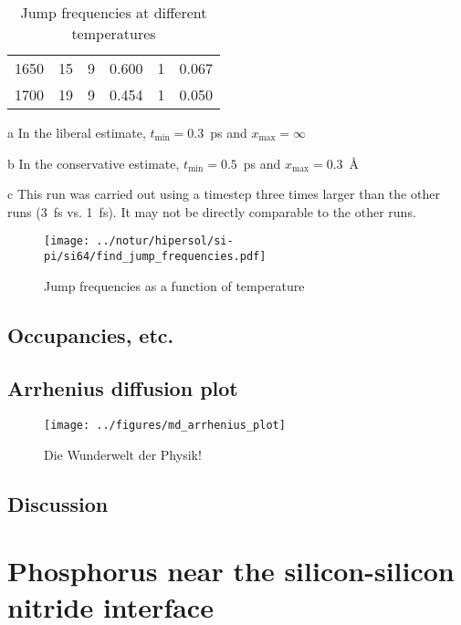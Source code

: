 \documentclass[11pt,bibliography=totoc,index=totoc]{scrbook}   %
\begin{document}
\begin{table}[htbp]
\begin{threeparttable}[htbp]
\begin{tabular}{rrrrrr}
        1650 &  15 &  9 & 0.600 &  1 & 0.067 \\
        1700 &  19 &  9 & 0.454 &  1 & 0.050 \\
      \bottomrule
    \end{tabular}
    {\footnotesize
    \begin{tablenotes}
      \item[a] In the liberal estimate, $t_{\text{min}}=0.3$~ps and $x_{\text{max}}=\infty$
      \item[b] In the conservative estimate, $t_{\text{min}}=0.5$~ps and $x_{\text{max}}=0.3$~Å
      \item[c] This run was carried out using a timestep three times larger than the other runs (3~fs vs. 1~fs). 
          It may not be directly comparable to the other runs.
    \end{tablenotes}
    }
  \end{threeparttable}
  \caption{Jump frequencies at different temperatures}
  \label{tab:jumps}
\end{table}

\begin{figure}[htp]
  \centering
  \texttt{[image: ../notur/hipersol/si-pi/si64/find\_jump\_frequencies.pdf]}
  \caption{Jump frequencies as a function of temperature}
  \label{fig:jumpfreq}
\end{figure}

\section{Occupancies, etc.}



\section{Arrhenius diffusion plot}

\begin{figure}[htbp]
  \begin{center}
    \texttt{[image: ../figures/md\_arrhenius\_plot]}
  \end{center}
  \caption{
    Die Wunderwelt der Physik!
  }
  \label{fig:md_arrhenius_plot}
\end{figure}

\section{Discussion}


\chapter{Phosphorus near the silicon-silicon nitride interface}
\end{document}
